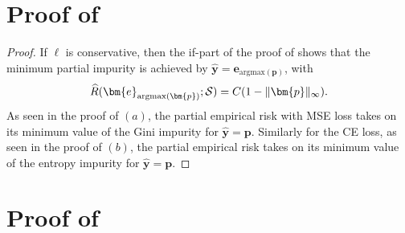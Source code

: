 \documentclass[letterpaper]{article} %
\newcommand{\bx}{{\bm{x}}}
\newcommand{\bp}{{\bm{p}}}
\newcommand{\by}{{\bm{y}}}
\newcommand{\be}{{\bm{e}}}
\newcommand{\T}{{\mathsf{T}}}
\newcommand{\cS}{{\cal{S}}}
\newcommand{\cD}{{\cal{D}}}
\newcommand{\WS}{{W_{\cal{S}}}}
\newcommand{\simplex}{\Delta}
\newcommand{\argmax}{\mathrm{argmax}}
\begin{document}
\section{Proof of }
\label{app:one-hot-predictions}
\ohp*
\begin{proof}
    If $\ell$ is conservative, then the if-part of the proof of  shows that the
    minimum partial impurity is achieved by $\widehat{\by} = \be_{\argmax(\bp)}$, with
    \[
        \widehat{R}(\be_{\argmax(\bp)};\cS) = C(1-\|\bp\|_\infty).
    \]
    As seen in the proof of  $(a)$, the partial empirical risk with MSE loss takes on its minimum value of the Gini impurity for $\widehat{\by}=\bp$.
    Similarly for the CE loss, as seen in the proof of  $(b)$, the partial empirical risk takes on its minimum value of the entropy impurity for $\widehat{\by}=\bp$.
\end{proof}


\section{Proof of }
\label{app:hoeffding}


\end{document}
